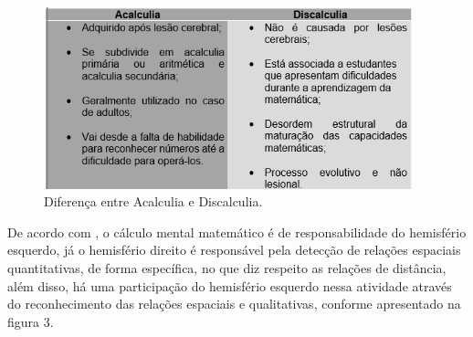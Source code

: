 \documentclass[
	12pt,				%
    oneside,			%
	a4paper,			%
	english,			%
	french,				%
	spanish,			%
	brazil,				%
	]{abntex2}
\begin{document}
\begin{figure} [hbt] 
\label{figura1} 
\caption{Diferença entre Acalculia e Discalculia.}
\includegraphics[width=0.95\textwidth]{diferenca_acalculia_discalculia.png} %
\end{figure}




De acordo com \cite{Lent}, o cálculo mental matemático é de responsabilidade do hemisfério esquerdo, já o hemisfério direito é responsável pela detecção de relações espaciais quantitativas, de forma específica, no que diz respeito as relações de distância, além disso, há uma participação do hemisfério esquerdo nessa atividade através do reconhecimento das relações espaciais e qualitativas, conforme apresentado na figura 3.
\end{document}

